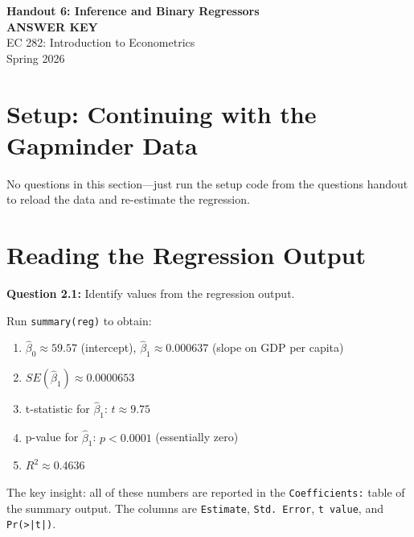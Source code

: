 \documentclass[11pt,letterpaper]{article}
\begin{document}
\begin{center}
{\LARGE\bfseries Handout 6: Inference and Binary Regressors}\\[0.3cm]
{\Large\color{red}\bfseries ANSWER KEY}\\[0.5cm]
{\large EC 282: Introduction to Econometrics}\\[0.3cm]
{\large Spring 2026}
\end{center}

\vspace{0.5cm}

\section{Setup: Continuing with the Gapminder Data}

No questions in this section---just run the setup code from the questions handout to reload the data and re-estimate the regression.

\section{Reading the Regression Output}

\textbf{Question 2.1:} Identify values from the regression output.

\begin{answer}
Run \texttt{summary(reg)} to obtain:

\begin{enumerate}[label=(\alph*)]
\item $\hat{\beta}_0 \approx 59.57$ (intercept), $\hat{\beta}_1 \approx 0.000637$ (slope on GDP per capita)
\item $SE(\hat{\beta}_1) \approx 0.0000653$
\item t-statistic for $\hat{\beta}_1$: $t \approx 9.75$
\item p-value for $\hat{\beta}_1$: $p < 0.0001$ (essentially zero)
\item $R^2 \approx 0.4636$
\end{enumerate}

The key insight: all of these numbers are reported in the \texttt{Coefficients:} table of the summary output. The columns are \texttt{Estimate}, \texttt{Std. Error}, \texttt{t value}, and \texttt{Pr(>|t|)}.
\end{answer}
\end{document}
